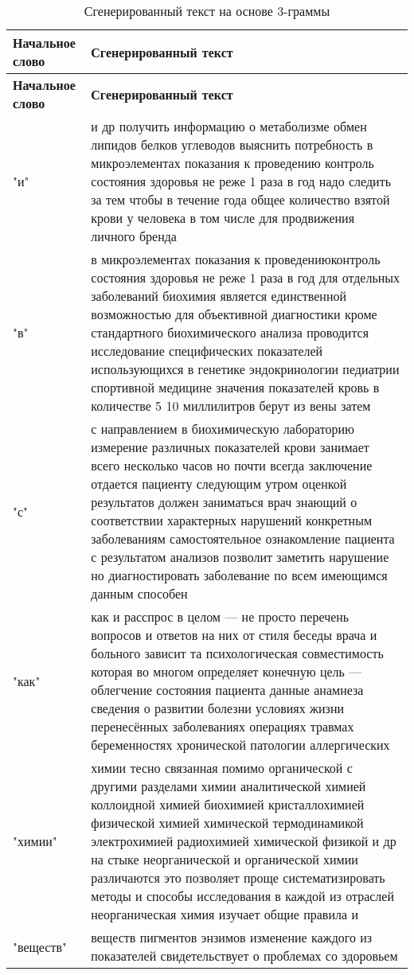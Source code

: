 \begin{longtable}{|p{4cm}|p{12cm}|}
    \caption{Сгенерированный текст на основе 3-граммы}
    \hline
    \textbf{Начальное слово} & \textbf{Сгенерированный текст} \\ \hline
    \endfirsthead
    \hline
    \textbf{Начальное слово} & \textbf{Сгенерированный текст} \\ \hline
    \endhead
    "и" &  и др получить информацию о метаболизме обмен липидов белков углеводов выяснить потребность в микроэлементах показания к проведению контроль состояния здоровья не реже 1 раза в год надо следить за тем чтобы в течение года общее количество взятой крови у человека в том числе для продвижения личного бренда \\ \hline
    "в" &  в микроэлементах показания к проведениюконтроль состояния здоровья не реже 1 раза в год для отдельных заболеваний биохимия является единственной возможностью для объективной диагностики кроме стандартного биохимического анализа проводится исследование специфических показателей использующихся в генетике эндокринологии педиатрии спортивной медицине значения показателей кровь в количестве 5 10 миллилитров берут из вены затем \\ \hline
    "с" &  с направлением в биохимическую лабораторию измерение различных показателей крови занимает всего несколько часов но почти всегда заключение отдается пациенту следующим утром оценкой результатов должен заниматься врач знающий о соответствии характерных нарушений конкретным заболеваниям самостоятельное ознакомление пациента с результатом анализов позволит заметить нарушение но диагностировать заболевание по всем имеющимся данным способен    \\ \hline
    "как" &  как и расспрос в целом — не просто перечень вопросов и ответов на них от стиля беседы врача и больного зависит та психологическая совместимость которая во многом определяет конечную цель — облегчение состояния пациента данные анамнеза сведения о развитии болезни условиях жизни перенесённых заболеваниях операциях травмах беременностях хронической патологии аллергических    \\ \hline
    "химии" &  химии тесно связанная помимо органической с другими разделами химии аналитической химией коллоидной химией биохимией кристаллохимией физической химией химической термодинамикой электрохимией радиохимией химической физикой и др на стыке неорганической и органической химии различаются это позволяет проще систематизировать методы и способы исследования в каждой из отраслей неорганическая химия изучает общие правила и    \\ \hline
    "веществ" & веществ пигментов энзимов изменение каждого из показателей свидетельствует о проблемах со здоровьем \\ \hline
\end{longtable}


